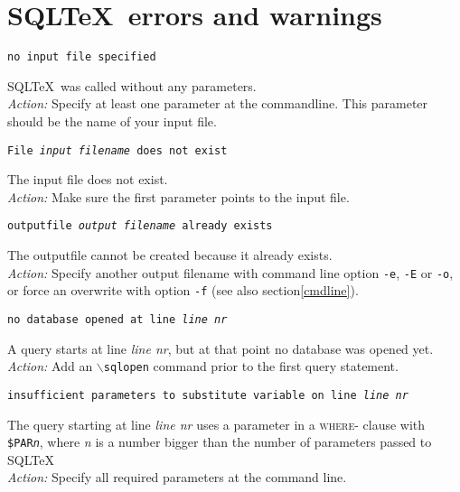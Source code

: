 \documentclass{article}
\newcommand{\bs}{\begin{math}\backslash\end{math}}
\newcommand{\vs}{\vspace{3mm}}
\begin{document}
\section{SQL\TeX\ errors and warnings}

\noindent\texttt{no input file specified}

\vspace{1mm}

\noindent SQL\TeX\ was called without any parameters.\\
\textit{Action:} Specify at least one parameter at the commandline. This parameter should be
the name of your input file.

\vs

\noindent\texttt{File \textit{input filename} does not exist}

\vspace{1mm}

\noindent The input file does not exist.\\
\textit{Action:} Make sure the first parameter points to the input file.

\vs

\noindent\texttt{outputfile \textit{output filename} already exists}

\vspace{1mm}

\noindent The outputfile cannot be created because it already exists.\\
\textit{Action:} Specify another output filename with command line option \texttt{-e},
\texttt{-E} or \texttt{-o}, or force an overwrite with option \texttt{-f} (see also section\ref{cmdline}).

\vs

\noindent\texttt{no database opened at line \textit{line nr}}

\vspace{1mm}

\noindent A query starts at line \textit{line nr}, but at that point no database was opened yet. \\
\textit{Action:} Add an \texttt{\bs sqlopen} command prior to the first query statement.

\vs

\noindent\texttt{insufficient parameters to substitute variable on line \textit{line nr}}

\vspace{1mm}

\noindent The query starting at line \textit{line nr} uses a parameter in a \textsc{where}- clause with
\texttt{\$PAR\textit{n}}, where \textit{n} is a number bigger than the number of parameters
passed to SQL\TeX\. \\
\textit{Action:} Specify all required parameters at the command line.
\end{document}
